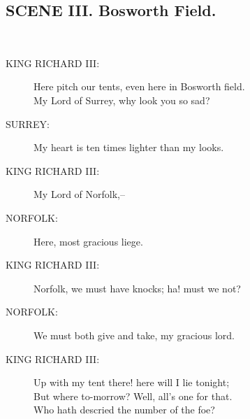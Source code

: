 \documentclass{article}
\begin{document}
\subsection*{SCENE III.  Bosworth Field.}
\\
\begin{description}
\item[KING RICHARD III:] 
\hspace{1pt}Here pitch our tents, even here in Bosworth field.\\
\hspace{1pt}My Lord of Surrey, why look you so sad?\\
\end{description}
\begin{description}
\item[SURREY:] 
\hspace{1pt}My heart is ten times lighter than my looks.\\
\end{description}
\begin{description}
\item[KING RICHARD III:] 
\hspace{1pt}My Lord of Norfolk,--\\
\end{description}
\begin{description}
\item[NORFOLK:] 
\hspace{1pt}Here, most gracious liege.\\
\end{description}
\begin{description}
\item[KING RICHARD III:] 
\hspace{1pt}Norfolk, we must have knocks; ha! must we not?\\
\end{description}
\begin{description}
\item[NORFOLK:] 
\hspace{1pt}We must both give and take, my gracious lord.\\
\end{description}
\begin{description}
\item[KING RICHARD III:] 
\hspace{1pt}Up with my tent there! here will I lie tonight;\\
\hspace{1pt}But where to-morrow?  Well, all's one for that.\\
\hspace{1pt}Who hath descried the number of the foe?\\
\end{description}
\end{document}
